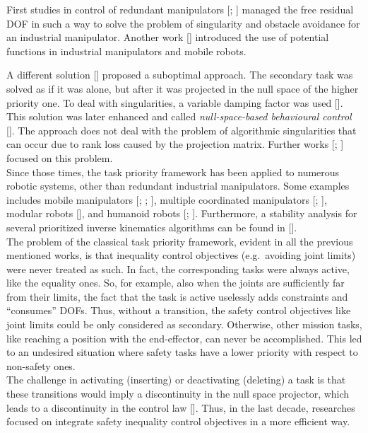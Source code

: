 First studies in control of redundant manipulators [\cite{IntroTpik6}; \cite{IntroTpik5}] managed the free residual DOF in such a way to solve the problem of singularity and obstacle avoidance for an industrial manipulator. Another work [\cite{IntroTpik7}] introduced the use of potential functions in industrial manipulators and mobile robots.

A different solution [\cite{IntroTpik8}] proposed a suboptimal approach. The secondary task was solved as if it was alone, but after it was projected in the null space of the higher priority one. To deal with singularities, a variable damping factor was used [\cite{IntroTpik1}]. This solution was later enhanced and called \textit{null-space-based behavioural control} [\cite{IntroTpik9}].
The approach does not deal with the problem of algorithmic singularities that can occur due to rank loss caused by the projection matrix. Further works [\cite{IntroTpik11}; \cite{IntroTpik10}] focused on this problem.\\


Since those times, the task priority framework has been applied to numerous robotic systems, other than redundant industrial manipulators. Some examples includes mobile manipulators [\cite{IntroTpik12}; \cite{IntroTpik13}; \cite{IntroTpik14}], multiple coordinated manipulators [\cite{IntroTpik15}; \cite{IntroTpik16}], modular robots [\cite{IntroTpik17}], and humanoid robots [\cite{IntroTpik18}; \cite{IntroTpik19}]. Furthermore, a stability analysis for several prioritized inverse kinematics algorithms can be found in [\cite{IntroTpik20}].\\


The problem of the classical task priority framework, evident in all the previous mentioned works, is that inequality control objectives (e.g.\ avoiding
joint limits) were never treated as such. In fact, the corresponding tasks were always active, like the equality ones. So, for example, also when the joints are sufficiently far from their limits, the fact that the task is active uselessly adds constraints and \enquote{consumes} DOFs.
Thus, without a transition, the safety control objectives like joint limits could be only considered as secondary. Otherwise, other mission tasks, like reaching a position with the end-effector, can never be accomplished. This led to an undesired situation where safety tasks have a lower priority with respect to non-safety ones.\\


The challenge in activating (inserting) or deactivating (deleting) a task is that these transitions would imply a discontinuity in the null space projector, which leads to a discontinuity in the control law [\cite{IntroTpik21}]. Thus, in the last decade, researches focused on integrate safety inequality control objectives in a more efficient way. 

